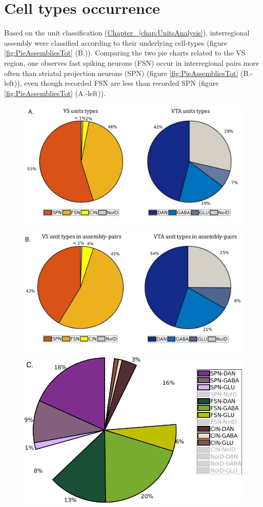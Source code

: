 \section{Cell types occurrence}
\label{sec:AsseTypes}
Based on the unit classification (\hyperref[chap:UnitsAnalysis]{Chapter~ \ref*{chap:UnitsAnalysis}}), interregional assembly were classified according to their underlying cell-types (figure \ref{fig:PieAssembliesTot} (B.)).
Comparing the two pie charts related to the VS region, one observes fast spiking neurons (FSN) occur in interregional pairs more often than striatal projection neurons (SPN) (figure \ref{fig:PieAssembliesTot} (B.-left)), even though recorded FSN are less than recorded SPN (figure \ref{fig:PieAssembliesTot} (A.-left)).
\label{sec:CellTypesOcc}
\begin{figure}[H]
    \centering
    \includegraphics[scale=0.35]{figures/PieRegions1.pdf}
    \includegraphics[scale=0.35]{figures/PieAsNotAs.pdf}
    \includegraphics[scale=0.35]{figures/PieAssembliesTot1.png}

\end{figure}
